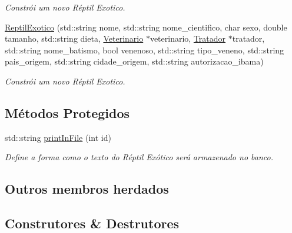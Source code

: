 \begin{DoxyCompactItemize}
\begin{DoxyCompactList}\small\item\em Constrói um novo Réptil Exotico. \end{DoxyCompactList}\item 
\hyperlink{classReptilExotico_a6f235b3c70d16cbd6686a7285849593c}{Reptil\+Exotico} (std\+::string nome, std\+::string nome\+\_\+cientifico, char sexo, double tamanho, std\+::string dieta, \hyperlink{classVeterinario}{Veterinario} $\ast$veterinario, \hyperlink{classTratador}{Tratador} $\ast$tratador, std\+::string nome\+\_\+batismo, bool venenoso, std\+::string tipo\+\_\+veneno, std\+::string pais\+\_\+origem, std\+::string cidade\+\_\+origem, std\+::string autorizacao\+\_\+ibama)
\begin{DoxyCompactList}\small\item\em Constrói um novo Réptil Exotico. \end{DoxyCompactList}\end{DoxyCompactItemize}
\subsection*{Métodos Protegidos}
\begin{DoxyCompactItemize}
\item 
std\+::string \hyperlink{classReptilExotico_a71312f425b92e04d8f29a856abd83f26}{print\+In\+File} (int id)
\begin{DoxyCompactList}\small\item\em Define a forma como o texto do Réptil Exótico será armazenado no banco. \end{DoxyCompactList}\end{DoxyCompactItemize}
\subsection*{Outros membros herdados}


\subsection{Construtores \& Destrutores}
\mbox{\label{classReptilExotico_a116a23b987d0470f9631e04ee4c99a3b}} 
